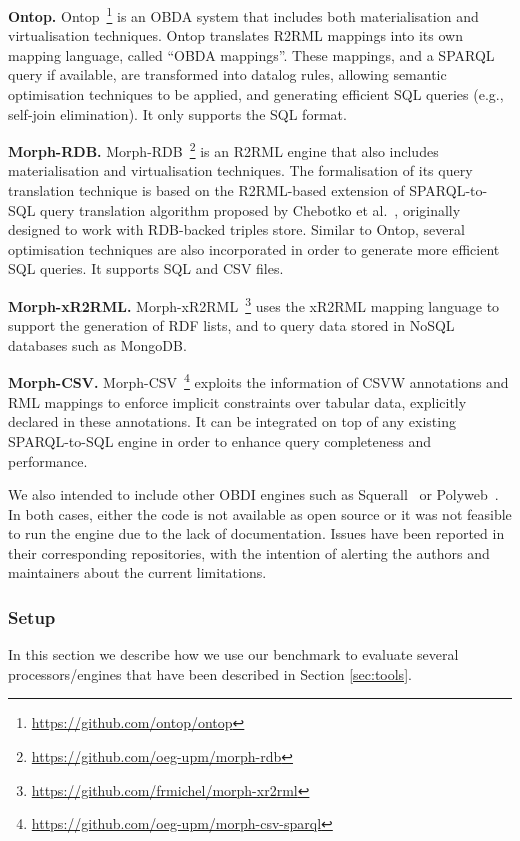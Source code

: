 \noindent\textbf{Ontop.} Ontop~\citep{rodriguez2015efficient}\footnote{\url{https://github.com/ontop/ontop}} is an OBDA system that includes both materialisation and virtualisation techniques. Ontop translates R2RML mappings into its own mapping language, called ``OBDA mappings''. These mappings, and a SPARQL query if available, are transformed into datalog rules, allowing semantic optimisation techniques to be applied, and generating efficient SQL queries (e.g., self-join elimination). It only supports the SQL format.

\noindent\textbf{Morph-RDB.} Morph-RDB~\citep{priyatna2014formalisation}\footnote{\url{https://github.com/oeg-upm/morph-rdb}} is an R2RML engine that also includes materialisation and virtualisation techniques. The formalisation of its query translation technique is based on the R2RML-based extension of SPARQL-to-SQL query translation algorithm proposed by Chebotko et al.~\citep{chebotko2009semantics}, originally designed to work with RDB-backed triples store. Similar to Ontop, several optimisation techniques are also incorporated in order to generate more efficient SQL queries. It supports SQL and CSV files.

\noindent\textbf{Morph-xR2RML.} Morph-xR2RML~\citep{michel2015translation}\footnote{\url{https://github.com/frmichel/morph-xr2rml}} uses the xR2RML mapping language to support the generation of RDF lists, and to query data stored in NoSQL databases such as MongoDB.

\noindent\textbf{Morph-CSV.} Morph-CSV~\citep{chaves2020enhancing}\footnote{\url{https://github.com/oeg-upm/morph-csv-sparql}} exploits the information of CSVW annotations and RML mappings to enforce implicit constraints over tabular data, explicitly declared in these annotations. It can be integrated on top of any existing SPARQL-to-SQL engine in order to enhance query completeness and performance.

We also intended to include other OBDI engines such as Squerall~\citep{mami2019querying} or Polyweb~\citep{khan2019one}. In both cases, either the code is not available as open source or it was not feasible to run the engine due to the lack of documentation. Issues have been reported in their corresponding repositories, with the intention of alerting the authors and maintainers about the current limitations.

\subsubsection{Setup}
In this section we describe how we use our benchmark to evaluate several processors/engines that have been described in Section \ref{sec:tools}. 

